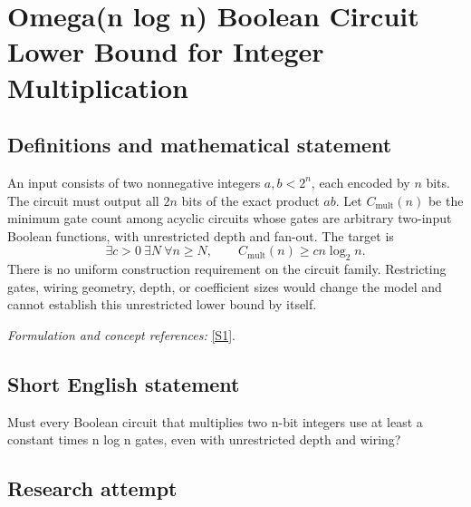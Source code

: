 \documentclass[11pt,a4paper]{article}
\newcommand{\sref}[2]{\hyperlink{source:#1:#2}{[S#2]}}
\newif\ifshowcatalogue
\newcommand{\cataloguescope}[1]{\ifshowcatalogue
 \paragraph{Exact scope in the supplied catalogue.}
 \begin{quote}\small #1\end{quote}\fi}
\numberwithin{equation}{section}
\begin{document}
\setcounter{section}{188}
\clearpage
\section{\texorpdfstring{Omega(n log n) Boolean Circuit Lower Bound for Integer Multiplication}{Omega(n log n) Boolean Circuit Lower Bound for Integer Multiplication}}\label{189}
\subsection{Definitions and mathematical statement}
An input consists of two nonnegative integers $a,b<2^n$, each encoded by $n$ bits. The circuit must output all $2n$ bits of the exact product $ab$. Let $C_{\mathrm{mult}}(n)$ be the minimum gate count among acyclic circuits whose gates are arbitrary two-input Boolean functions, with unrestricted depth and fan-out. The target is
\[
 \exists c>0\ \exists N\ \forall n\ge N,
 \qquad C_{\mathrm{mult}}(n)\ge c n\log_2n.
\]
There is no uniform construction requirement on the circuit family. Restricting gates, wiring geometry, depth, or coefficient sizes would change the model and cannot establish this unrestricted lower bound by itself.
\par\smallskip\textit{Formulation and concept references:} \sref{189}{1}.
\cataloguescope{Let C\_mult(n) be the least gate count of an acyclic Boolean circuit with 2n input bits, all 2n output bits of the product of the two nonnegative n-bit inputs, arbitrary binary Boolean gates, unrestricted fan-out and depth, and no uniformity requirement. There exist constants c>0 and N such that C\_mult(n)>=c*n*log2(n) for every n>=N.}
\subsection{Short English statement}
Must every Boolean circuit that multiplies two n-bit integers use at least a constant times n log n gates, even with unrestricted depth and wiring?
\subsection{Research attempt}
\end{document}
